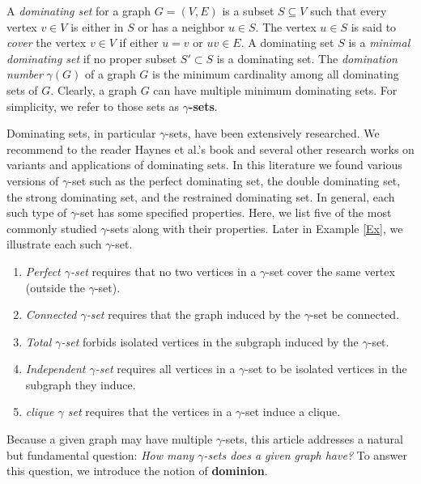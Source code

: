 \documentclass[twoside,12pt]{article}
\begin{document}
A {\it dominating set} for a graph $G = (V,E)$ is a subset $S \subseteq V$ such that every vertex $v\in V$ is either in $S$ or has a neighbor $u\in S$. The vertex $u \in S$ is said to \textit{cover}  the vertex $v \in V$ if either $u=v$ or $uv\in E$. A dominating set $S$ is a \textit{minimal dominating set} if no proper subset $S'\subset S$ is a dominating set. The \textit{domination number} $\gamma(G)$ of a graph $G$ is the minimum cardinality among all dominating sets of $G$. Clearly, a graph $G$ can have multiple minimum dominating sets. For simplicity, we refer to those sets as \textbf{$\gamma$-sets}. 

Dominating sets, in particular $\gamma$-sets, have been extensively researched. We recommend to the reader Haynes et al.'s book \cite{Hay2} and several other research works \cite{FB, BR, EC, GD, MH, FH, Hay1, ML} on variants and applications of dominating sets.
In this literature we found various versions of $\gamma$-set such as the perfect dominating set, the double dominating set, the strong dominating set, and the restrained dominating set. In general, each such type of $\gamma$-set has some specified properties. Here, we list five of the most commonly studied $\gamma$-sets along with their properties. Later in Example \ref{Ex}, we illustrate each such $\gamma$-set.

\begin{enumerate}
	\item \textit{Perfect $\gamma$-set} requires that no two vertices in a $\gamma$-set cover the same vertex (outside the $\gamma$-set). \item \textit{Connected $\gamma$-set} requires that the graph induced by the $\gamma$-set be connected.
	\item \textit{Total $\gamma$-set} forbids isolated vertices in the subgraph induced by the $\gamma$-set.
	\item \textit{Independent $\gamma$-set} requires all vertices in a $\gamma$-set to be isolated vertices in the subgraph they induce.
	\item \textit{clique $\gamma$ set} requires that the vertices in a $\gamma$-set induce a clique.
\end{enumerate}

Because a given graph may have multiple $\gamma$-sets, this article addresses a natural but fundamental question:\textit{ How many  $\gamma$-sets does a given graph have?} To answer this question, we introduce the notion of \textbf{dominion}.
\end{document}
